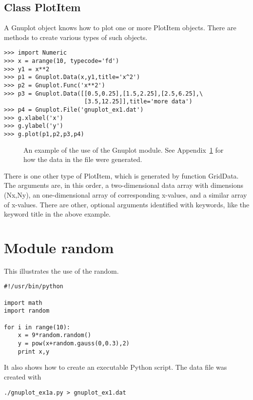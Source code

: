 \documentclass{article}
\begin{document}
\subsection{Class {\ttfamily PlotItem}}

A {\ttfamily Gnuplot} object knows how to plot one or more
{\ttfamily PlotItem} objects.
There are methods to create various types of such objects.
\begin{verbatim}
>>> import Numeric
>>> x = arange(10, typecode='fd')
>>> y1 = x**2
>>> p1 = Gnuplot.Data(x,y1,title='x^2')
>>> p2 = Gnuplot.Func('x**2')
>>> p3 = Gnuplot.Data([[0.5,0.25],[1.5,2.25],[2.5,6.25],\
                       [3.5,12.25]],title='more data')
>>> p4 = Gnuplot.File('gnuplot_ex1.dat')
>>> g.xlabel('x')
>>> g.ylabel('y')
>>> g.plot(p1,p2,p3,p4)
\end{verbatim}
\begin{figure}[h!tb]
\begin{center}
\caption{\label{fig:gnuplot1}An example of the use of the {\ttfamily Gnuplot}
module.  See Appendix~\ref{ap:random} for how the data in the file were generated.}
\end{center}
\end{figure}

There is one other type of {\ttfamily PlotItem}, which is generated by
function {\ttfamily GridData}. The arguments are, in this order, a two-dimensional
data array with dimensions ({\ttfamily Nx,Ny}), an one-dimensional array
of corresponding {\ttfamily x}-values, and a similar array of {\ttfamily x}-values.
There are other, optional arguments identified with keywords, like the keyword
{\ttfamily title} in the above example.

\section{Module {\ttfamily random}}\label{ap:random}

This illustrates the use of the {\ttfamily random}.
\begin{verbatim}
#!/usr/bin/python

import math
import random

for i in range(10):
    x = 9*random.random()
    y = pow(x+random.gauss(0,0.3),2)
    print x,y
\end{verbatim}
It also shows how to create an executable Python script.  The data file was created
with
\begin{verbatim}
./gnuplot_ex1a.py > gnuplot_ex1.dat
\end{verbatim}
\end{document}
